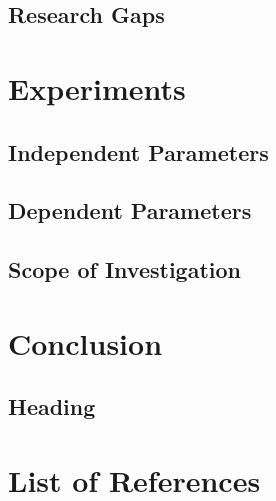 \documentclass[12pt]{article}
\begin{document}
\subsection{Research Gaps}

\pagebreak
\section{Experiments}

\subsection{Independent Parameters}

\subsection{Dependent Parameters}

\subsection{Scope of Investigation}

\pagebreak
\section{Conclusion}

\subsection{Heading}

\pagebreak
\section*{List of References}
\renewcommand{\thepage}{R-\arabic{page}}

\end{document}
